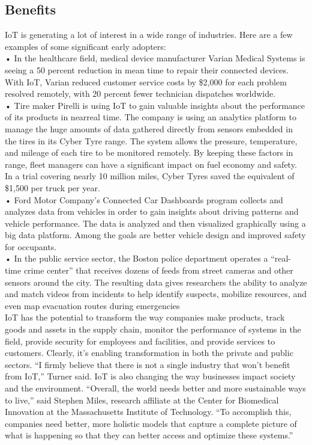 \subsection{Benefits}
IoT is generating a lot of interest in a wide range of industries. Here are a few examples of some significant
early adopters:\\
• In the healthcare field, medical device manufacturer Varian Medical Systems is seeing a 50 percent reduction
in mean time to repair their connected devices.\cite{varian_reduce} With IoT, Varian reduced customer service costs by
\$2,000 for each problem resolved remotely, with 20 percent fewer technician dispatches worldwide.\\
• Tire maker Pirelli is using IoT to gain valuable insights about the performance of its products in nearreal
time. The company is using an analytics platform to manage the huge amounts of data gathered
directly from sensors embedded in the tires in its Cyber Tyre range. The system allows the pressure,
temperature, and mileage of each tire to be monitored remotely. By keeping these factors in range, fleet
managers can have a significant impact on fuel economy and safety. In a trial covering nearly 10 million
miles, Cyber Tyres saved the equivalent of \$1,500 per truck per year.\\
• Ford Motor Company’s Connected Car Dashboards program collects and analyzes data from vehicles
in order to gain insights about driving patterns and vehicle performance. The data is analyzed and
then visualized graphically using a big data platform. Among the goals are better vehicle design and
improved safety for occupants.\\
• In the public service sector, the Boston police department operates a “real-time crime center” that
receives dozens of feeds from street cameras and other sensors around the city. The resulting data gives
researchers the ability to analyze and match videos from incidents to help identify suspects, mobilize
resources, and even map evacuation routes during emergencies\\

IoT has the potential to transform the way companies make products, track goods and assets in the supply
chain, monitor the performance of systems in the field, provide security for employees and facilities,
and provide services to customers. Clearly, it’s enabling transformation in both the private and public
sectors. “I firmly believe that there is not a single industry that won’t benefit from IoT,” Turner said.
IoT is also changing the way businesses impact society and the environment. “Overall, the world needs better
and more sustainable ways to live,” said Stephen Miles, research affiliate at the Center for Biomedical
Innovation at the Massachusetts Institute of Technology. “To accomplish this, companies need better,
more holistic models that capture a complete picture of what is happening so that they can better access
and optimize these systems.”

